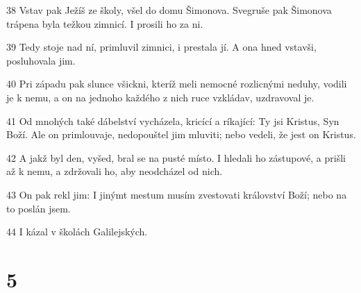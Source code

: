 \par 38 Vstav pak Ježíš ze školy, všel do domu Šimonova. Svegruše pak Šimonova trápena byla težkou zimnicí. I prosili ho za ni.
\par 39 Tedy stoje nad ní, primluvil zimnici, i prestala jí. A ona hned vstavši, posluhovala jim.
\par 40 Pri západu pak slunce všickni, kteríž meli nemocné rozlicnými neduhy, vodili je k nemu, a on na jednoho každého z nich ruce vzkládav, uzdravoval je.
\par 41 Od mnohých také dábelství vycházela, kricící a ríkající: Ty jsi Kristus, Syn Boží. Ale on primlouvaje, nedopouštel jim mluviti; nebo vedeli, že jest on Kristus.
\par 42 A jakž byl den, vyšed, bral se na pusté místo. I hledali ho zástupové, a prišli až k nemu, a zdržovali ho, aby neodcházel od nich.
\par 43 On pak rekl jim: I jinýmt mestum musím zvestovati království Boží; nebo na to poslán jsem.
\par 44 I kázal v školách Galilejských.

\chapter{5}

